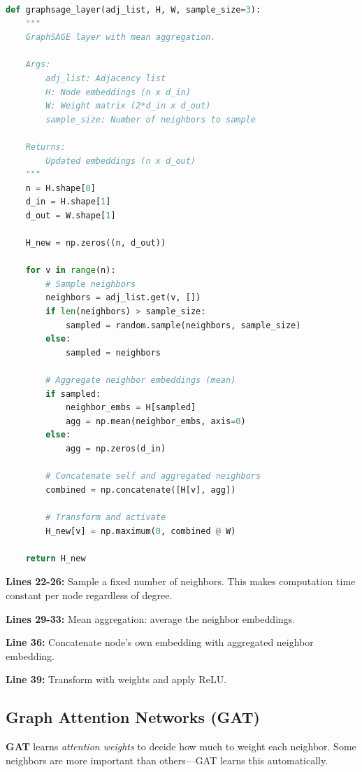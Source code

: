 \documentclass[12pt,a4paper]{article}
\begin{document}
\begin{lstlisting}[language=Python,caption={GraphSAGE mean aggregation}]
def graphsage_layer(adj_list, H, W, sample_size=3):
    """
    GraphSAGE layer with mean aggregation.

    Args:
        adj_list: Adjacency list
        H: Node embeddings (n x d_in)
        W: Weight matrix (2*d_in x d_out)
        sample_size: Number of neighbors to sample

    Returns:
        Updated embeddings (n x d_out)
    """
    n = H.shape[0]
    d_in = H.shape[1]
    d_out = W.shape[1]

    H_new = np.zeros((n, d_out))

    for v in range(n):
        # Sample neighbors
        neighbors = adj_list.get(v, [])
        if len(neighbors) > sample_size:
            sampled = random.sample(neighbors, sample_size)
        else:
            sampled = neighbors

        # Aggregate neighbor embeddings (mean)
        if sampled:
            neighbor_embs = H[sampled]
            agg = np.mean(neighbor_embs, axis=0)
        else:
            agg = np.zeros(d_in)

        # Concatenate self and aggregated neighbors
        combined = np.concatenate([H[v], agg])

        # Transform and activate
        H_new[v] = np.maximum(0, combined @ W)

    return H_new
\end{lstlisting}

\begin{explanation}
\textbf{Lines 22-26:} Sample a fixed number of neighbors. This makes computation time constant per node regardless of degree.

\textbf{Lines 29-33:} Mean aggregation: average the neighbor embeddings.

\textbf{Line 36:} Concatenate node's own embedding with aggregated neighbor embedding.

\textbf{Line 39:} Transform with weights and apply ReLU.
\end{explanation}

\subsection{Graph Attention Networks (GAT)}

\begin{concept}
\textbf{GAT} learns \textit{attention weights} to decide how much to weight each neighbor. Some neighbors are more important than others---GAT learns this automatically.
\end{concept}
\end{document}
